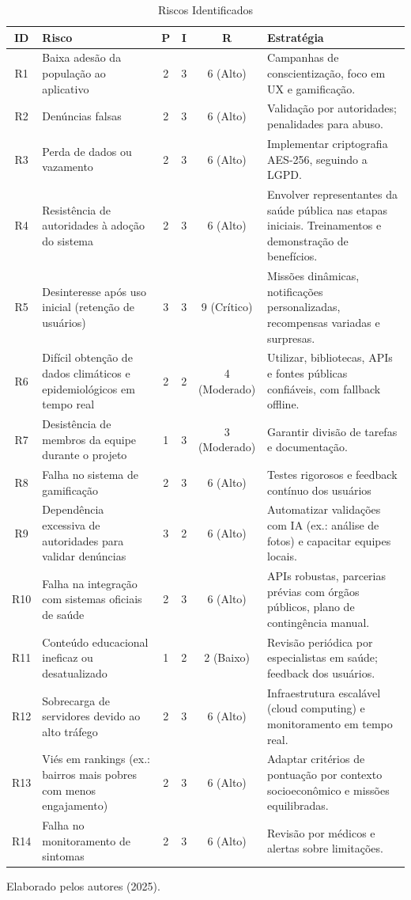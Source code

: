 \documentclass[a4paper, 12pt]{article}
\begin{document}
\begin{table}
\caption{Riscos Identificados}
\label{tab:risks}
\begin{tabular}{|c|p{4cm}|c|c|c|p{5.7cm}|}
\hline
\textbf{ID} & \textbf{Risco} & \textbf{P} & \textbf{I} & \textbf{R} & \textbf{Estratégia} \\
\hline
R1 & Baixa adesão da população ao aplicativo & 2 & 3 & 6 (Alto) & Campanhas de conscientização, foco em UX e gamificação. \\
\hline
R2 & Denúncias falsas & 2 & 3 & 6 (Alto) & Validação por autoridades; penalidades para abuso. \\
\hline
R3 & Perda de dados ou vazamento & 2 & 3 & 6 (Alto) & Implementar criptografia AES-256, seguindo a LGPD. \\
\hline
R4 & Resistência de autoridades à adoção do sistema & 2 & 3 & 6 (Alto) & Envolver representantes da saúde pública nas etapas iniciais. Treinamentos e demonstração de benefícios. \\
\hline
R5 & Desinteresse após uso inicial (retenção de usuários) & 3 & 3 & 9 (Crítico) & Missões dinâmicas, notificações personalizadas, recompensas variadas e surpresas. \\
\hline
R6 & Difícil obtenção de dados climáticos e epidemiológicos em tempo real & 2 & 2 & 4 (Moderado) & Utilizar, bibliotecas, APIs e fontes públicas confiáveis, com fallback offline. \\
\hline
R7 & Desistência de membros da equipe durante o projeto & 1 & 3 & 3 (Moderado) & Garantir divisão de tarefas e documentação. \\
\hline
R8 & Falha no sistema de gamificação & 2 & 3 & 6 (Alto) & Testes rigorosos e feedback contínuo dos usuários\\
\hline
R9 & Dependência excessiva de autoridades para validar denúncias & 3 & 2 & 6 (Alto) & Automatizar validações com IA (ex.: análise de fotos) e capacitar equipes locais. \\
\hline
R10 & Falha na integração com sistemas oficiais de saúde & 2 & 3 & 6 (Alto) & APIs robustas, parcerias prévias com órgãos públicos, plano de contingência manual. \\
\hline
R11 & Conteúdo educacional ineficaz ou desatualizado & 1 & 2 & 2 (Baixo) & Revisão periódica por especialistas em saúde; feedback dos usuários. \\
\hline
R12 & Sobrecarga de servidores devido ao alto tráfego & 2 & 3 & 6 (Alto) & Infraestrutura escalável (cloud computing) e monitoramento em tempo real. \\
\hline
R13 & Viés em rankings (ex.: bairros mais pobres com menos engajamento) & 2 & 3 & 6 (Alto) & Adaptar critérios de pontuação por contexto socioeconômico e missões equilibradas. \\
\hline
R14 & Falha no monitoramento de sintomas  & 2 & 3 & 6 (Alto) & Revisão por médicos e alertas sobre limitações. \\
\hline
\end{tabular}
\smallskip
Elaborado pelos autores (2025).
\end{table}
\end{document}
